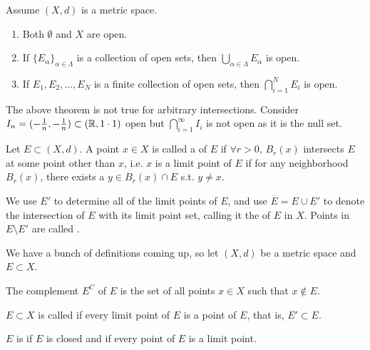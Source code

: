 \documentclass{book}
\begin{document}
\begin{thm}
    Assume $(X,d)$ is a metric space.
    \begin{enumerate}
        \item Both $\emptyset$ and $X$ are open.
        \item If $\{E_\alpha\}_{\alpha \in \Lambda}$ is a collection of open sets, then $\bigcup_{\alpha\in \Lambda} E_\alpha$ is open.
        \item If $E_1, E_2, \ldots, E_N$ is a finite collection of open sets, then $\bigcap_{i = 1}^N E_i$ is open.
    \end{enumerate}
\end{thm}

\begin{remark}
    The above theorem is not true for arbitrary intersections. Consider $I_n = (-\frac{1}{n}, -\frac{1}{n}) \subset (\mathbb{R}, 1 \cdot 1)$ open but $\bigcap_{i=1}^\infty I_i$ is not open as it is the null set.
\end{remark}

\begin{defn}
    Let $E \subset (X, d)$. A point $x \in X$ is called a  of $E$ if $\forall r > 0$, $B_r(x)$ intersects $E$ at some point other than $x$, i.e. $x$ is a limit point of $E$ if for any neighborhood $B_r(x)$, there exists a $y \in B_r(x) \cap E$ s.t. $y \neq x$.
\end{defn}

We use $E'$ to determine all of the limit points of $E$, and use $\overline{E} = E \cup E'$ to denote the intersection of $E$ with its limit point set, calling it the  of $E$ in $X$. Points in $E \setminus E'$ are called . 

We have a bunch of definitions coming up, so let $(X, d)$ be a metric space and $E \subset X$. 

\begin{defn}[Complement]
    The complement $E^C$ of $E$ is the set of all points $x \in X$ such that $x \notin E$. 
\end{defn}

\begin{defn}[Closed]
    $E \subset X$ is called  if every limit point of $E$ is a point of $E$, that is, $E' \subset E$. 
\end{defn}

\begin{defn}[Perfect]
    $E$ is  if $E$ is closed and if every point of $E$ is a limit point.
\end{defn}
\end{document}
